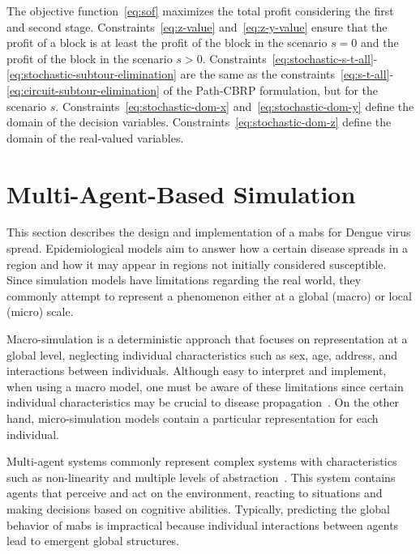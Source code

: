 The objective function~\eqref{eq:sof} maximizes the total profit considering the first and second stage.
Constraints~\eqref{eq:z-value} and~\eqref{eq:z-y-value} ensure that the profit of a block is at least the profit of the block in the scenario $s = 0$ and the profit of the block in the scenario $s > 0$.
Constraints~\eqref{eq:stochastic-s-t-all}-\eqref{eq:stochastic-subtour-elimination} are the same as the constraints~\eqref{eq:s-t-all}-\eqref{eq:circuit-subtour-elimination} of the Path-CBRP formulation, but for the scenario $s$.
Constraints~\eqref{eq:stochastic-dom-x} and~\eqref{eq:stochastic-dom-y} define the domain of the decision variables.
Constraints~\eqref{eq:stochastic-dom-z} define the domain of the real-valued variables.


\section{Multi-Agent-Based Simulation}\label{sec:multi-agent-simulation}

This section describes the design and implementation of a \gls{mabs} for Dengue
virus spread. Epidemiological models aim to answer how a certain disease spreads
in a region and how it may appear in regions not initially considered
susceptible. Since simulation models have limitations regarding the real world,
they commonly attempt to represent a phenomenon either at a global (macro) or
local (micro) scale.

Macro-simulation is a deterministic approach that focuses on representation at a
global level, neglecting individual characteristics such as sex, age, address,
and interactions between individuals. Although easy to interpret and implement,
when using a macro model, one must be aware of these limitations since certain
individual characteristics may be crucial to disease
propagation~\citep{damien:2017}. On the other hand, micro-simulation models
contain a particular representation for each individual.

Multi-agent systems commonly represent complex systems with characteristics such
as non-linearity and multiple levels of abstraction~\citep{furtado:2015}. This
system contains agents that perceive and act on the environment, reacting to
situations and making decisions based on cognitive abilities. Typically,
predicting the global behavior of \gls{mabs} is impractical because individual
interactions between agents lead to emergent global structures.

